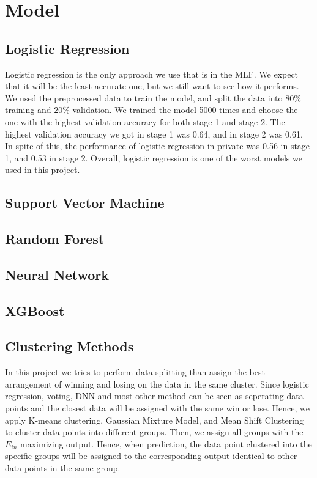 \documentclass[12pt,a4paper]{article}
\begin{document}
\section{Model}

\subsection{Logistic Regression}

Logistic regression is the only approach we use that is in the MLF. We expect that it will be the least accurate one, but we still want to see how it performs. We used the preprocessed data to train the model, and split the data into 80\% training and 20\% validation. We trained the model 5000 times and choose the one with the highest validation accuracy for both stage 1 and stage 2. The highest validation accuracy we got in stage 1 was 0.64, and in stage 2 was 0.61. In spite of this, the performance of logistic regression in private was 0.56 in stage 1, and 0.53 in stage 2. Overall, logistic regression is one of the worst models we used in this project.

\subsection{Support Vector Machine}

\subsection{Random Forest}

\subsection{Neural Network}

\subsection{XGBoost}

\subsection{Clustering Methods}
In this project we tries to perform data splitting than assign the best arrangement of winning and losing on the data in the same cluster.
Since logistic regression, voting, DNN and most other method can be seen as seperating data points and the closest data will be assigned with the same win or lose.
Hence, we apply K-means clustering, Gaussian Mixture Model, and Mean Shift Clustering to cluster data points into different groups.
Then, we assign all groups with the $E_{in}$ maximizing output.
Hence, when prediction, the data point clustered into the specific groups will be assigned to the corresponding output identical to other data points in the same group.
\end{document}
